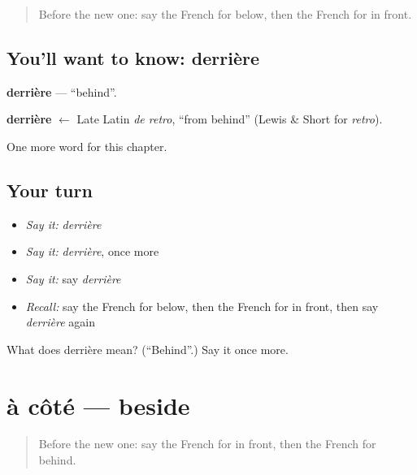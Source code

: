 \label{lesson:FR-C157-derriere}



\begin{quote}
Before the new one: say the French for below, then the French for in front.
\end{quote}

\subsection*{You'll want to know: derrière}
\textbf{derrière} — \textquotedblleft{}behind\textquotedblright{}.

\begin{cousinweb}
\textbf{derrière} $\leftarrow$ Late Latin \emph{de retro}, \textquotedblleft{}from behind\textquotedblright{} (Lewis \& Short for \emph{retro}).
\end{cousinweb}

\begin{grammarlens}[title={What you've built}]
One more word for this chapter.
\end{grammarlens}

\subsection*{Your turn}
\begin{itemize}
\raggedright
  \item \emph{Say it:} \emph{derrière}
  \item \emph{Say it:} \emph{derrière}, once more
  \item \emph{Say it:} say \emph{derrière}
  \item \emph{Recall:} say the French for below, then the French for in front, then say \emph{derrière} again
\end{itemize}

\begin{tcolorbox}[breakable,colback=teal!4,colframe=teal!35!black,title={Before you move on}]
What does derrière mean? (\textquotedblleft{}Behind\textquotedblright{}.) Say it once more.
\end{tcolorbox}
\section[à côté]{à côté — beside}

\label{lesson:FR-C157-a-cote}



\begin{quote}
Before the new one: say the French for in front, then the French for behind.
\end{quote}

